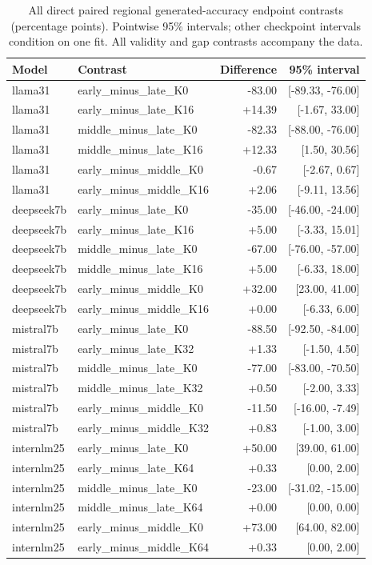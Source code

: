 \begin{table}[htbp]\centering\color{blue}\footnotesize
\caption{All direct paired regional generated-accuracy endpoint contrasts (percentage points). Pointwise 95\% intervals; other checkpoint intervals condition on one fit. All validity and gap contrasts accompany the data.}
\label{stab:regional_pairs}
\begin{tabular}{llrr}
\toprule
Model & Contrast & Difference & 95\% interval \\
\midrule
llama31 & early\_minus\_late\_K0 & -83.00 & [-89.33, -76.00] \\
llama31 & early\_minus\_late\_K16 & +14.39 & [-1.67, 33.00] \\
llama31 & middle\_minus\_late\_K0 & -82.33 & [-88.00, -76.00] \\
llama31 & middle\_minus\_late\_K16 & +12.33 & [1.50, 30.56] \\
llama31 & early\_minus\_middle\_K0 & -0.67 & [-2.67, 0.67] \\
llama31 & early\_minus\_middle\_K16 & +2.06 & [-9.11, 13.56] \\
deepseek7b & early\_minus\_late\_K0 & -35.00 & [-46.00, -24.00] \\
deepseek7b & early\_minus\_late\_K16 & +5.00 & [-3.33, 15.01] \\
deepseek7b & middle\_minus\_late\_K0 & -67.00 & [-76.00, -57.00] \\
deepseek7b & middle\_minus\_late\_K16 & +5.00 & [-6.33, 18.00] \\
deepseek7b & early\_minus\_middle\_K0 & +32.00 & [23.00, 41.00] \\
deepseek7b & early\_minus\_middle\_K16 & +0.00 & [-6.33, 6.00] \\
mistral7b & early\_minus\_late\_K0 & -88.50 & [-92.50, -84.00] \\
mistral7b & early\_minus\_late\_K32 & +1.33 & [-1.50, 4.50] \\
mistral7b & middle\_minus\_late\_K0 & -77.00 & [-83.00, -70.50] \\
mistral7b & middle\_minus\_late\_K32 & +0.50 & [-2.00, 3.33] \\
mistral7b & early\_minus\_middle\_K0 & -11.50 & [-16.00, -7.49] \\
mistral7b & early\_minus\_middle\_K32 & +0.83 & [-1.00, 3.00] \\
internlm25 & early\_minus\_late\_K0 & +50.00 & [39.00, 61.00] \\
internlm25 & early\_minus\_late\_K64 & +0.33 & [0.00, 2.00] \\
internlm25 & middle\_minus\_late\_K0 & -23.00 & [-31.02, -15.00] \\
internlm25 & middle\_minus\_late\_K64 & +0.00 & [0.00, 0.00] \\
internlm25 & early\_minus\_middle\_K0 & +73.00 & [64.00, 82.00] \\
internlm25 & early\_minus\_middle\_K64 & +0.33 & [0.00, 2.00] \\
\bottomrule\end{tabular}\end{table}
